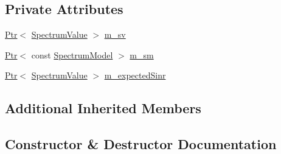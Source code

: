 \subsection*{Private Attributes}
\begin{DoxyCompactItemize}
\item 
\hyperlink{classns3_1_1Ptr}{Ptr}$<$ \hyperlink{classns3_1_1SpectrumValue}{Spectrum\+Value} $>$ \hyperlink{classLteDownlinkDataSinrTestCase_aacc1cc479474b53cb702f762c3bb0bfb}{m\+\_\+sv}
\item 
\hyperlink{classns3_1_1Ptr}{Ptr}$<$ const \hyperlink{classns3_1_1SpectrumModel}{Spectrum\+Model} $>$ \hyperlink{classLteDownlinkDataSinrTestCase_a40a431bb7ebfbb6b4a60ed281db7e173}{m\+\_\+sm}
\item 
\hyperlink{classns3_1_1Ptr}{Ptr}$<$ \hyperlink{classns3_1_1SpectrumValue}{Spectrum\+Value} $>$ \hyperlink{classLteDownlinkDataSinrTestCase_a6c43322f73d1561591fcb4380f7ef49c}{m\+\_\+expected\+Sinr}
\end{DoxyCompactItemize}
\subsection*{Additional Inherited Members}


\subsection{Constructor \& Destructor Documentation}
